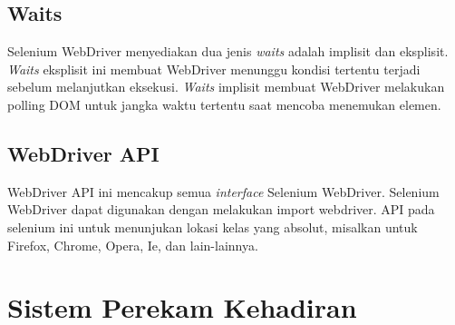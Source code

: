 \subsection{Waits}
Selenium WebDriver menyediakan dua jenis \textit{waits} adalah implisit dan eksplisit. \textit{Waits} eksplisit ini membuat WebDriver menunggu kondisi tertentu terjadi sebelum melanjutkan eksekusi. \textit{Waits} implisit membuat WebDriver melakukan polling DOM untuk jangka waktu tertentu saat mencoba menemukan elemen.

\subsection{WebDriver API}
WebDriver API ini mencakup semua \textit{interface} Selenium WebDriver. Selenium WebDriver dapat digunakan dengan melakukan import webdriver. API pada selenium ini untuk menunjukan lokasi kelas yang absolut, misalkan untuk Firefox, Chrome, Opera, Ie, dan lain-lainnya.

\section{Sistem Perekam Kehadiran}
\label{sec:sistem}





